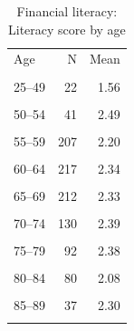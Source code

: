 \begin{table}[htbp]\centering\small
\caption{Financial literacy: Literacy score by age}
\label{tab:finlit_score_by_age}
\begin{tabular}{lrr}\toprule
Age & N & Mean \\\\ \midrule
25--49 & 22 & 1.56 \\\\
50--54 & 41 & 2.49 \\\\
55--59 & 207 & 2.20 \\\\
60--64 & 217 & 2.34 \\\\
65--69 & 212 & 2.33 \\\\
70--74 & 130 & 2.39 \\\\
75--79 & 92 & 2.38 \\\\
80--84 & 80 & 2.08 \\\\
85--89 & 37 & 2.30 \\\\
\bottomrule
\end{tabular}\end{table}

